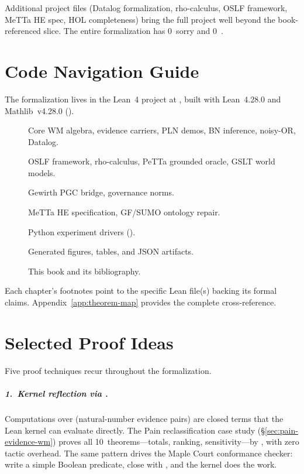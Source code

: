 \documentclass[11pt,openany]{report}
\begin{document}
\noindent
Additional project files (Datalog formalization, rho-calculus,
OSLF framework, MeTTa HE spec, HOL completeness) bring the
full project well beyond the book-referenced slice.  The entire formalization
has 0~sorry and 0~.


\chapter{Code Navigation Guide}
\label{app:code-nav}

The formalization lives in the Lean~4 project at
, built with Lean~4.28.0 and
Mathlib~v4.28.0 ().

\begin{description}
\item[] Core WM algebra, evidence
  carriers, PLN demos, BN inference, noisy-OR, Datalog.
\item[] OSLF framework, rho-calculus,
  PeTTa grounded oracle, GSLT world models.
\item[] Gewirth PGC bridge, governance
  norms.
\item[] MeTTa HE specification,
  GF/SUMO ontology repair.
\item[] Python experiment drivers
  ().
\item[] Generated figures, tables, and JSON
  artifacts.
\item[] This book and its bibliography.
\end{description}

\noindent
Each chapter's footnotes point to the specific Lean file(s)
backing its formal claims.  Appendix~\ref{app:theorem-map}
provides the complete cross-reference.


\chapter{Selected Proof Ideas}
\label{app:proof-ideas}

Five proof techniques recur throughout the formalization.

\paragraph{1.\ Kernel reflection via .}
Computations over  (natural-number evidence
pairs) are closed terms that the Lean kernel can evaluate
directly.  The Pain reclassification case study
(\S\ref{sec:pain-evidence-wm}) proves all 10~theorems---totals,
ranking, sensitivity---by , with zero tactic
overhead.  The same pattern drives the Maple Court conformance
checker: write a simple Boolean predicate, close with
, and the kernel does the work.
\end{document}
